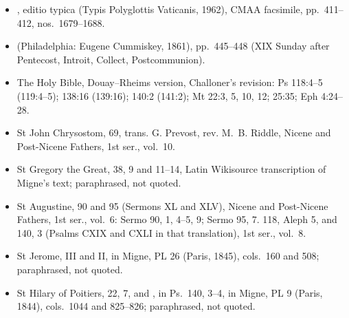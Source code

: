 {\footnotesize
\begin{itemize}\setlength{\itemsep}{0.15em}\setlength{\parskip}{0pt}
\item {}, editio typica (Typis Polyglottis Vaticanis, 1962), CMAA facsimile, pp.~411--412, nos.~1679--1688.
\item {} (Philadelphia: Eugene Cummiskey, 1861), pp.~445--448 (XIX Sunday after Pentecost, Introit, Collect, Postcommunion).
\item The Holy Bible, Douay--Rheims version, Challoner's revision: Ps 118:4--5 (119:4--5); 138:16 (139:16); 140:2 (141:2); Mt 22:3, 5, 10, 12; 25:35; Eph 4:24--28.
\item St John Chrysostom,  69, trans. G. Prevost, rev. M.~B. Riddle, Nicene and Post-Nicene Fathers, 1st ser., vol.~10.
\item St Gregory the Great,  38, 9 and 11--14, Latin Wikisource transcription of Migne's text; paraphrased, not quoted.
\item St Augustine,  90 and 95 (Sermons XL and XLV), Nicene and Post-Nicene Fathers, 1st ser., vol.~6: Sermo 90, 1, 4--5, 9; Sermo 95, 7.  118, Aleph 5, and 140, 3 (Psalms CXIX and CXLI in that translation), 1st ser., vol.~8.
\item St Jerome,  III and  II, in Migne, PL 26 (Paris, 1845), cols.~160 and 508; paraphrased, not quoted.
\item St Hilary of Poitiers,  22, 7, and , in Ps.~140, 3--4, in Migne, PL 9 (Paris, 1844), cols.~1044 and 825--826; paraphrased, not quoted.
\end{itemize}
\par}
